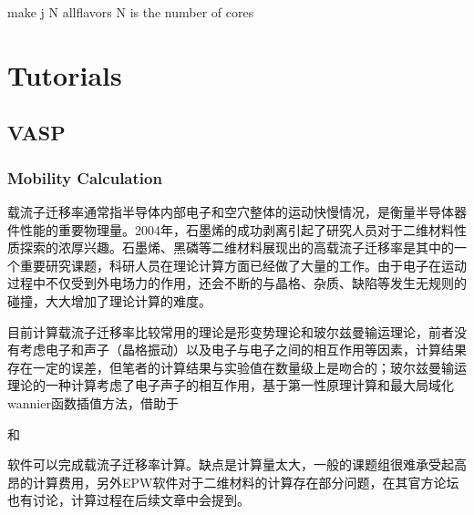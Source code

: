 \documentclass[a4paper,12pt,english]{sphinxmanual}
\begin{document}
\begin{sphinxVerbatim}[commandchars=\\\{\}]
make \PYGZhy{}j N all\PYGZhy{}flavors N is the number of cores
\end{sphinxVerbatim}


\chapter{Tutorials}
\label{\detokenize{tutorial:tutorials}}\label{\detokenize{tutorial::doc}}

\section{VASP}
\label{\detokenize{tutorial:vasp}}

\subsection{Mobility Calculation}
\label{\detokenize{tutorials/vasp/mobility:mobility-calculation}}\label{\detokenize{tutorials/vasp/mobility::doc}}
\sphinxAtStartPar
载流子迁移率通常指半导体内部电子和空穴整体的运动快慢情况，是衡量半导体器件性能的重要物理量。2004年，石墨烯的成功剥离引起了研究人员对于二维材料性质探索的浓厚兴趣。石墨烯、黑磷等二维材料展现出的高载流子迁移率是其中的一个重要研究课题，科研人员在理论计算方面已经做了大量的工作。由于电子在运动过程中不仅受到外电场力的作用，还会不断的与晶格、杂质、缺陷等发生无规则的碰撞，大大增加了理论计算的难度。

\sphinxAtStartPar
目前计算载流子迁移率比较常用的理论是形变势理论和玻尔兹曼输运理论，前者没有考虑电子和声子（晶格振动）以及电子与电子之间的相互作用等因素，计算结果存在一定的误差，但笔者的计算结果与实验值在数量级上是吻合的；玻尔兹曼输运理论的一种计算考虑了电子\sphinxhyphen{}声子的相互作用，基于第一性原理计算和最大局域化wannier函数插值方法，借助于 %
\begin{footnote}[25]\sphinxAtStartFootnote
{}
%
\end{footnote} 和 %
\begin{footnote}[26]\sphinxAtStartFootnote
{}
%
\end{footnote} 软件可以完成载流子迁移率计算。缺点是计算量太大，一般的课题组很难承受起高昂的计算费用，另外EPW软件对于二维材料的计算存在部分问题，在其官方论坛也有讨论，计算过程在后续文章中会提到。
\end{document}
